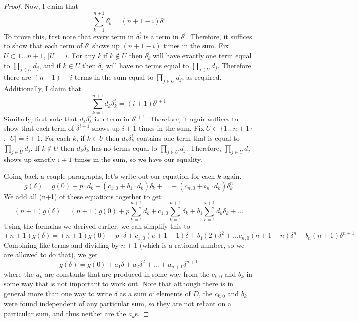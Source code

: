 \documentclass[]{book}
\newcommand{\abs}[1]{\left\lvert #1 \right\rvert}
\begin{document}
\begin{proof}
  Now, I claim that
  \[ \sum_{k=1}^{n+1}\delta_k^i = (n + 1 - i)\delta^i \]
  To prove this, first note that every term in $\delta_i^i$ is a term in $\delta^i$. Therefore, it suffices to show that each term of $\delta^i$ shows up $(n + 1 - i)$ times in the sum. Fix $U \subset {1 \ldots n+1}$, $\abs{U} = i$. For any $k$ if $k \not \in U$ then $\delta_k^i$ will have exactly one term equal to $\prod_{j \in U}d_j$, and if $k \in U$ then $\delta_k^i$ will have no terms equal to $\prod _{j \in U}d_j$. Therefore there are $(n+1) - i$ terms in the sum equal to $\prod_{j \in U}d_j$, as required.
  Additionally, I claim that
  \[ \sum_{k=1}^{n+1}d_k\delta_k^i = (i+1)\delta^{i+1} \]
  Similarly, first note that $d_k\delta_k^i$ is a term in $\delta^{i+1}$. Therefore, it again suffices to show that each term of $\delta^{i+1}$ shows up $i+1$ times in the sum. Fix $U \subset \{1 \ldots n+1\}$, $\abs{U} = i+1$. For each $k$, if $k \in U$ then $d_k\delta_k^i$ contains one term that is equal to $\prod_{j \in U}d_j$. If $k \not \in U$ then $d_k\delta_k$ has no terms equal to $\prod_{j \in U}d_j$. Therefore, $\prod_{j \in U}d_j$ shows up exactly $i+1$ times in the sum, so we have our equality.

  Going back a couple paragraphs, let's write out our equation for each $k$ again.
  \[ g(\delta) = g(0) + p \cdot d_k + (c_{1,0} + b_1 \cdot d_k)\delta_k + \ldots + (c_{n,0} + b_n \cdot d_k)\delta_k^n\]
  We add all (n+1) of these equations together to get:
  \[(n+1)g(\delta) = (n+1)g(0) + p\sum_{k=1}^{n+1}d_k + c_{1,0}\sum_{k=1}^{n+1}\delta_k + b_1\sum_{k=1}^{n+1}d_k\delta_k + \ldots \]
  Using the formulas we derived earlier, we can simplify this to
  \[(n+1)g(\delta) = (n+1)g(0) + p\cdot \delta + c_{1,0}(n+1-1)\delta + b_1(2)\delta^2 + \ldots c_{n,0}(n+1 - n)\delta^n + b_n(n+1)\delta^{n+1} \]
  Combining like terms and dividing by $n+1$ (which is a rational number, so we are allowed to do that), we get
  \[ g(\delta) = g(0) + a_1\delta + a_2\delta^2 + \ldots + a_{n+1}\delta^{n+1}\]
  where the $a_k$ are constants that are produced in some way from the $c_{k,0}$ and $b_k$ in some way that is not important to work out. Note that although there is in general more than one way to write $\delta$ as a sum of elements of $D$, the $c_{k,0}$ and $b_k$ were found independent of any particular sum, so they are not reliant on a particular sum, and thus neither are the $a_k$s.


\end{proof}
\end{document}
